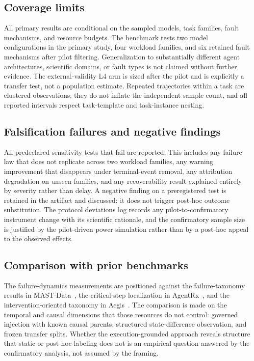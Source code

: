 \subsection{Coverage limits}

All primary results are conditional on the sampled models, task families,
fault mechanisms, and resource budgets. The benchmark tests two model
configurations in the primary study, four workload families, and six
retained fault mechanisms after pilot filtering. Generalization to
substantially different agent architectures, scientific domains, or fault
types is not claimed without further evidence. The external-validity L4
arm is sized after the pilot and is explicitly a transfer test, not a
population estimate. Repeated trajectories within a task are clustered
observations; they do not inflate the independent sample count, and all
reported intervals respect task-template and task-instance nesting.

\subsection{Falsification failures and negative findings}

All predeclared sensitivity tests that fail are reported. This includes any
failure law that does not replicate across two workload families, any
warning improvement that disappears under terminal-event removal, any
attribution degradation on unseen families, and any recoverability result
explained entirely by severity rather than delay. A negative finding on a
preregistered test is retained in the artifact and discussed; it does not
trigger post-hoc outcome substitution. The protocol deviations log records
any pilot-to-confirmatory instrument change with its scientific rationale,
and the confirmatory sample size is justified by the pilot-driven power
simulation rather than by a post-hoc appeal to the observed effects.

\subsection{Comparison with prior benchmarks}

The failure-dynamics measurements are positioned against the
failure-taxonomy results in MAST-Data~\citep{mast2025}, the critical-step
localization in AgentRx~\citep{agentrx2026}, and the intervention-oriented
taxonomy in Aegis~\citep{aegis2025}. The comparison is made on the temporal
and causal dimensions that those resources do not control: governed
injection with known causal parents, structured state-difference
observation, and frozen transfer splits. Whether the execution-grounded
approach reveals structure that static or post-hoc labeling does not is an
empirical question answered by the confirmatory analysis, not assumed by
the framing.

